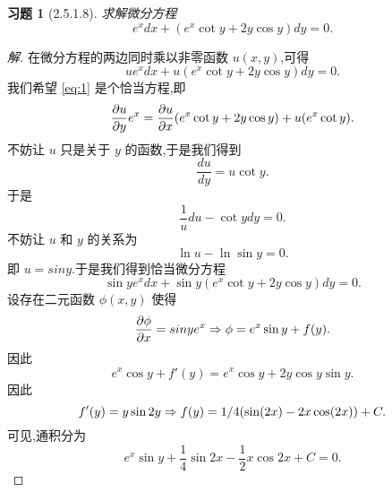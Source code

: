 \documentclass[a4paper, 12pt]{article} %
\newtheorem*{cdtheorem}{习题}
\newenvironment{exercise}
{\bigskip\begin{mdframed}[backgroundcolor=gray!40,rightline=false,leftline=false,topline=false,bottomline=false]\begin{cdtheorem}}
    {\end{cdtheorem}\end{mdframed}\bigskip}
\begin{document}
\begin{CJK}{UTF8}{gkai}
  \begin{exercise}[2.5.1.8]
求解微分方程
$$
e^xdx+(e^x\cot y+2y\cos y)dy=0.
$$
  \end{exercise}
  \begin{proof}[解]
在微分方程的两边同时乘以非零函数 $u(x,y)$,可得
\begin{equation}
  \label{eq:1}
  ue^xdx+u(e^x\cot y+2y\cos y)dy=0.
\end{equation}
我们希望 \eqref{eq:1} 是个恰当方程,即
$$
\frac{\partial u}{\partial y}e^x=\frac{\partial u}{\partial x}(e^x\cot y+2y\cos
y)+u(e^x\cot y).
$$
不妨让 $u$ 只是关于 $y$ 的函数,于是我们得到
$$
\frac{du}{dy}=u\cot y.
$$
于是
$$
\frac{1}{u}du-\cot ydy=0.
$$
不妨让 $u$ 和 $y$ 的关系为
$$
\ln u-\ln\sin y=0.
$$
即 $u=sin y$.于是我们得到恰当微分方程
\begin{equation}
  \label{eq:2}
  \sin ye^{x}dx+\sin y(e^x\cot y+2y\cos y)dy=0.
\end{equation}
设存在二元函数 $\phi(x,y)$ 使得
$$
\frac{\partial\phi}{\partial x}=sin ye^{x}\Rightarrow \phi=e^{x}\sin y+f(y).
$$
因此
$$
e^{x}\cos y+f'(y)=e^{x}\cos y+2y\cos y\sin y.
$$
因此
$$
f'(y)=y\sin 2y\Rightarrow f(y) = 1/4 (\sin(2 x)-2 x \cos(2 x))+C.
$$
可见,通积分为
$$
e^x\sin y+\frac{1}{4}\sin 2x-\frac{1}{2}x\cos 2x+C=0.
$$
\begin{comment}
不妨让 $u=e^{\frac{1}{2}y^2}$,因此我们得到了恰当方程
\begin{equation}
  \label{eq:2}
  e^{\frac{1}{2}y^2+x}dx+e^{\frac{1}{2}y^2}(e^x\cot y+2y\cos y)dy=0.
\end{equation}
设存在二元函数 $\phi(x,y)$ 满足
$$
\frac{\pa\phi}{\pa x}=e^{\frac{1}{2}y^2+x}\ri \phi=e^{\frac{1}{2}y^2+x}+f(y).
$$
因此
$$
ye^{\frac{1}{2}y^2+x}+f'(y)=e^{\frac{1}{2}y^2+x}\cot
y+2ye^{\frac{1}{2}y^2}\cos y.
$$
\end{comment}
  \end{proof}
  
  
  
  
  
\end{CJK}
\end{document}

